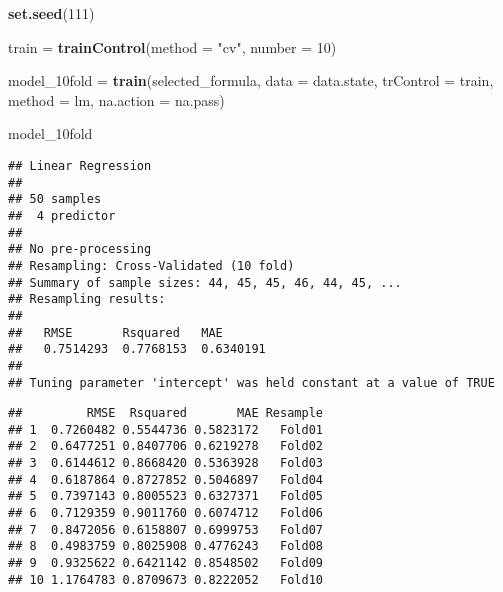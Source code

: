 \documentclass[
]{article}
\newenvironment{Shaded}{\begin{snugshade}}{\end{snugshade}}
\newcommand{\AttributeTok}[1]{\textcolor[rgb]{0.13,0.29,0.53}{#1}}
\newcommand{\DecValTok}[1]{\textcolor[rgb]{0.00,0.00,0.81}{#1}}
\newcommand{\FunctionTok}[1]{\textcolor[rgb]{0.13,0.29,0.53}{\textbf{#1}}}
\newcommand{\NormalTok}[1]{#1}
\newcommand{\OtherTok}[1]{\textcolor[rgb]{0.56,0.35,0.01}{#1}}
\newcommand{\SpecialCharTok}[1]{\textcolor[rgb]{0.81,0.36,0.00}{\textbf{#1}}}
\newcommand{\StringTok}[1]{\textcolor[rgb]{0.31,0.60,0.02}{#1}}
\begin{document}
\begin{Shaded}
\begin{Highlighting}[]
\FunctionTok{set.seed}\NormalTok{(}\DecValTok{111}\NormalTok{)}

\NormalTok{train }\OtherTok{=} \FunctionTok{trainControl}\NormalTok{(}\AttributeTok{method =} \StringTok{"cv"}\NormalTok{, }\AttributeTok{number =} \DecValTok{10}\NormalTok{)}

\NormalTok{model\_10fold }\OtherTok{=} \FunctionTok{train}\NormalTok{(selected\_formula,}
\AttributeTok{data =}\NormalTok{ data.state,}
\AttributeTok{trControl =}\NormalTok{ train,}
\AttributeTok{method =} \StringTok{\textquotesingle{}lm\textquotesingle{}}\NormalTok{,}
\AttributeTok{na.action =}\NormalTok{ na.pass)}

\NormalTok{model\_10fold}
\end{Highlighting}
\end{Shaded}

\begin{verbatim}
## Linear Regression 
## 
## 50 samples
##  4 predictor
## 
## No pre-processing
## Resampling: Cross-Validated (10 fold) 
## Summary of sample sizes: 44, 45, 45, 46, 44, 45, ... 
## Resampling results:
## 
##   RMSE       Rsquared   MAE      
##   0.7514293  0.7768153  0.6340191
## 
## Tuning parameter 'intercept' was held constant at a value of TRUE
\end{verbatim}

\begin{Shaded}
\end{Shaded}

\begin{verbatim}
##         RMSE  Rsquared       MAE Resample
## 1  0.7260482 0.5544736 0.5823172   Fold01
## 2  0.6477251 0.8407706 0.6219278   Fold02
## 3  0.6144612 0.8668420 0.5363928   Fold03
## 4  0.6187864 0.8727852 0.5046897   Fold04
## 5  0.7397143 0.8005523 0.6327371   Fold05
## 6  0.7129359 0.9011760 0.6074712   Fold06
## 7  0.8472056 0.6158807 0.6999753   Fold07
## 8  0.4983759 0.8025908 0.4776243   Fold08
## 9  0.9325622 0.6421142 0.8548502   Fold09
## 10 1.1764783 0.8709673 0.8222052   Fold10
\end{verbatim}
\end{document}
